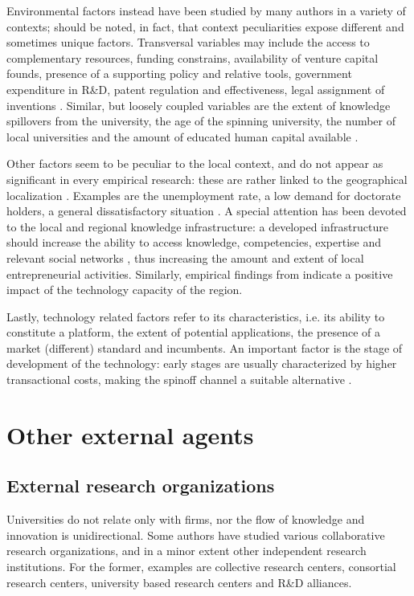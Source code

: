 Environmental factors instead have been studied by many authors in a variety of contexts; should be noted, in fact, that context peculiarities expose different and sometimes unique factors. Transversal variables may include the access to complementary resources, funding constrains, availability of venture capital founds, presence of a supporting policy and relative tools, government expenditure in R\&D, patent regulation and effectiveness, legal assignment of inventions \citep{OShea2004, Fini2009, Rizzo2015}. Similar, but loosely coupled variables are the extent of knowledge spillovers from the university, the age of the spinning university, the number of local universities and the amount of educated human capital available \citep{Audretsch2005}.

Other factors seem to be peculiar to the local context, and do not appear as significant in every empirical research: these are rather linked to the geographical localization \citep{OShea2004}. Examples are the unemployment rate, a low demand for doctorate holders, a general dissatisfactory situation \citep{Rizzo2015}. A special attention has been devoted to the local and regional knowledge infrastructure: a developed infrastructure should increase the ability to access knowledge, competencies, expertise and relevant social networks \citep{OShea2004}, thus increasing the amount and extent of local entrepreneurial activities. Similarly, empirical findings from \citet{Audretsch2005} indicate a positive impact of the technology capacity of the region.

Lastly, technology related factors refer to its characteristics, i.e. its ability to constitute a platform, the extent of potential applications, the presence of a market (different) standard and incumbents. An important factor is the stage of development of the technology: early stages are usually characterized by higher transactional costs, making the spinoff channel a suitable alternative \citep{Rizzo2015}. 

\section{Other external agents}

\subsection{External research organizations}

Universities do not relate only with firms, nor the flow of knowledge and innovation is unidirectional. Some authors have studied various collaborative research organizations, and in a minor extent other independent research institutions. For the former, examples are collective research centers, consortial research centers, university based research centers and R\&D alliances. 

